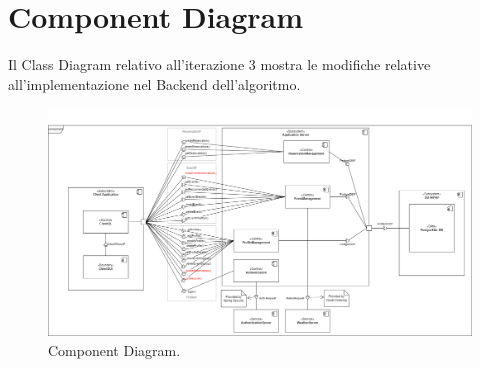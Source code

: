 \section{Component Diagram} 
Il Class Diagram relativo all'iterazione 3 mostra le modifiche relative all'implementazione nel Backend dell'algoritmo.
\begin{figure}[h!]
	\centering
	\includegraphics[width=0.8\linewidth]{Iterazione 3/images/Component.drawio.png}
	\caption{Component Diagram.}
	\label{fig:ComponentDiagramIt3}
\end{figure}
